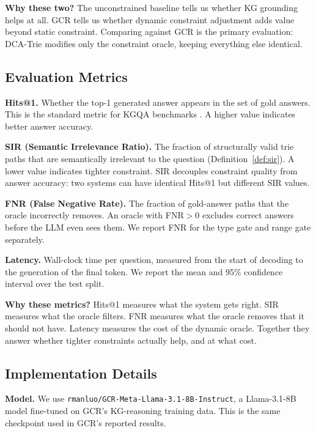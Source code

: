 \textbf{Why these two?} The unconstrained baseline tells us whether KG grounding helps
at all. GCR tells us whether dynamic constraint adjustment adds value beyond static
constraint. Comparing against GCR is the primary evaluation: DCA-Trie modifies only
the constraint oracle, keeping everything else identical.

\subsection{Evaluation Metrics}
\label{sec:metrics}

\textbf{Hits@1.} Whether the top-1 generated answer appears in the set of gold answers.
This is the standard metric for KGQA benchmarks \citep{luo2025-graph-constrained-reasoning,
li2024-decoding-on-graphs}. A higher value indicates better answer accuracy.

\textbf{SIR (Semantic Irrelevance Ratio).} The fraction of structurally valid trie
paths that are semantically irrelevant to the question (Definition~\ref{def:sir}). A
lower value indicates tighter constraint. SIR decouples constraint quality from answer
accuracy: two systems can have identical Hits@1 but different SIR values.

\textbf{FNR (False Negative Rate).} The fraction of gold-answer paths that the oracle
incorrectly removes. An oracle with FNR$>0$ excludes correct answers before the LLM
even sees them. We report FNR for the type gate and range gate separately.

\textbf{Latency.} Wall-clock time per question, measured from the start of decoding to
the generation of the final token. We report the mean and 95\% confidence interval over
the test split.

\textbf{Why these metrics?} Hits@1 measures what the system gets right. SIR measures
what the oracle filters. FNR measures what the oracle removes that it should not have.
Latency measures the cost of the dynamic oracle. Together they answer whether tighter
constraints actually help, and at what cost.

\subsection{Implementation Details}
\label{sec:implementation}

\textbf{Model.} We use \texttt{rmanluo/GCR-Meta-Llama-3.1-8B-Instruct}, a Llama-3.1-8B
model fine-tuned on GCR's KG-reasoning training data. This is the same checkpoint used
in GCR's reported results.

